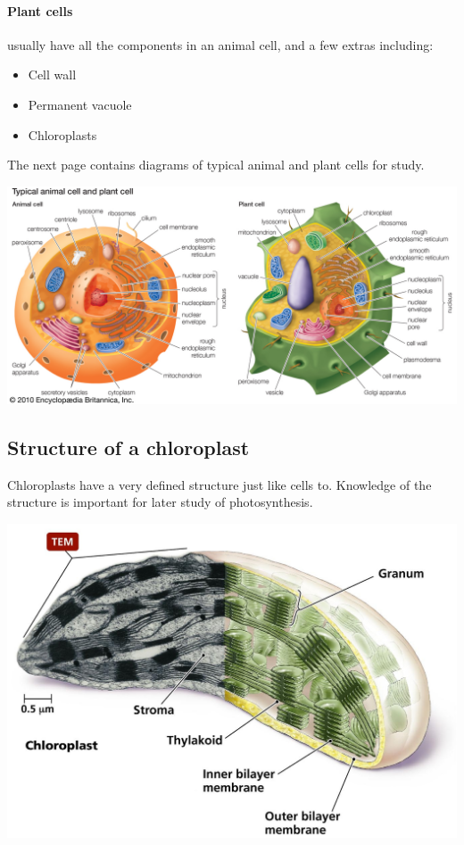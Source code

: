 \documentclass{article}
\begin{document}
\paragraph*{Plant cells} usually have all the components in an animal cell, and
a few extras including:

\begin{itemize}

	\item Cell wall

	\item Permanent vacuole

	\item Chloroplasts

\end{itemize}

The next page contains diagrams of typical animal and plant cells for study.

\begin{center}
	\includegraphics[angle=90,scale=0.35]{comparison}
\end{center}

\subsection*{Structure of a chloroplast}

Chloroplasts have a very defined structure just like cells to. Knowledge of the
structure is important for later study of photosynthesis. 

\begin{center}
	\includegraphics[angle=0,scale=0.5]{chloroplast}
\end{center}
\end{document}

